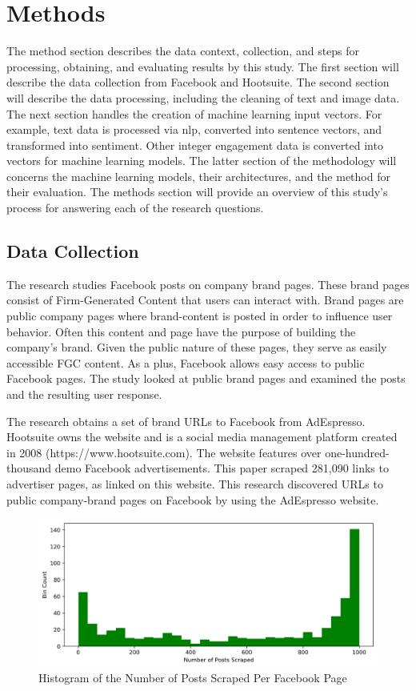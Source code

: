 \documentclass[mksc,blindrev]{informs3} %
\begin{document}
\section{Methods}
The method section describes the data context, collection, and steps for processing, obtaining, and evaluating results by this study. The first section will describe the data collection from Facebook and Hootsuite. The second section will describe the data processing, including the cleaning of text and image data. The next section handles the creation of machine learning input vectors. For example, text data is processed via nlp, converted into sentence vectors, and transformed into sentiment. Other integer engagement data is converted into vectors for machine learning models. The latter section of the methodology will concerns the machine learning models, their architectures, and the method for their evaluation. The methods section will provide an overview of this study's process for answering each of the research questions.

\subsection{Data Collection}
The research studies Facebook posts on company brand pages. These brand pages consist of Firm-Generated Content that users can interact with. Brand pages are public company pages where brand-content is posted in order to influence user behavior. Often this content and page have the purpose of building the company's brand. Given the public nature of these pages, they serve as easily accessible FGC content. As a plus, Facebook allows easy access to public Facebook pages. The study looked at public brand pages and examined the posts and the resulting user response.

The research obtains a set of brand URLs to Facebook from AdEspresso. Hootsuite owns the website and is a social media management platform created in 2008 (https://www.hootsuite.com). The website features over one-hundred-thousand demo Facebook advertisements. This paper scraped 281,090 links to advertiser pages, as linked on this website. This research discovered URLs to public company-brand pages on Facebook by using the AdEspresso website.

\begin{figure}
    \includegraphics[width=\columnwidth]{images/Posts_Per_Page_Histogram.png}
    \caption{Histogram of the Number of Posts Scraped Per Facebook Page}
    \label{fig:histogram_posts_scraped}
\end{figure}
\end{document}
